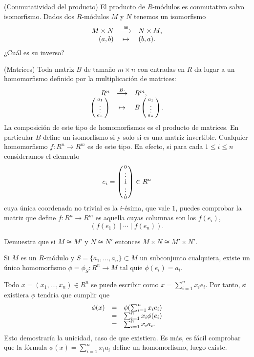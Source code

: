 \textrm{\normalfont (Conmutatividad del producto)} El
producto de \(R\)-módulos es conmutativo salvo isomorfismo. Dados dos
\(R\)-módulos \(M\) y \(N\) tenemos un isomorfismo
\[\begin{array}{rcl}M\times N&\stackrel{\cong}\longrightarrow&N\times M,\cr (a,b)&\mapsto&(b,a).\end{array}\]
¿Cuál es su inverso? 

\textrm{\normalfont (Matrices)} Toda matriz \(B\) de
tamaño \(m\times n\) con entradas en \(R\) da lugar a un homomorfismo
definido por la multiplicación de matrices:
\[\begin{array}{rcl} R^n&\stackrel{B\cdot}\longrightarrow&R^m,\cr \left(\begin{smallmatrix}a_1\cr\vdots\cr a_n\end{smallmatrix}\right)&\mapsto& B\left(\begin{smallmatrix}a_1\cr\vdots\cr a_n\end{smallmatrix}\right). \end{array}\]
La composición de este tipo de homomorfismos es el producto de matrices.
En particular \(B\) define un isomorfismo si y solo si es una matriz
invertible. Cualquier homomorfismo \(f\colon R^n\rightarrow R^m\) es de
este tipo. En efecto, si para cada \(1\leq i\leq n\) consideramos el
elemento
\[e_i=\left(\begin{smallmatrix}0\cr\vdots\cr1\cr\vdots\cr0\end{smallmatrix}\right)\in R^n\]
cuya única coordenada no trivial es la \(i\)-ésima, que vale \(1\),
puedes comprobar la matriz que define \(f\colon R^n\rightarrow R^m\) es
aquella cuyas columnas son los \(f(e_i)\),
\[\left(f(e_1)\mid\cdots\mid f(e_n)\right).\] 


Demuestra que si \(M\cong M'\) y \(N\cong N'\) entonces
\(M\times N\cong M'\times N'\). 


Si \(M\) es un \(R\)-módulo y \(S=\{a_1,\dots,a_n\}\subset M\) un
subconjunto cualquiera, existe un único homomorfismo
\(\phi=\phi_{S}\colon R^n\rightarrow M\) tal quie \(\phi(e_i)=a_i\).


Todo \(x=(x_1,\dots,x_n)\in R^n\) se puede escribir como
\(x=\sum_{i=1}^nx_ie_i\). Por tanto, si existiera \(\phi\) tendría
que cumplir que \[
\begin{array}{rcl}
\phi(x)&=&\phi(\sum_{i=1}^nx_ie_i)\cr
&=&\sum_{i=1}^nx_i\phi(e_i)\cr
&=&\sum_{i=1}^nx_ia_i.
\end{array}
\] Esto demostraría la unicidad, caso de que existiera. Es más, es fácil
comprobar que la fórmula \(\phi(x)=\sum_{i=1}^nx_ia_i\) define un
homomorfismo, luego existe. 

